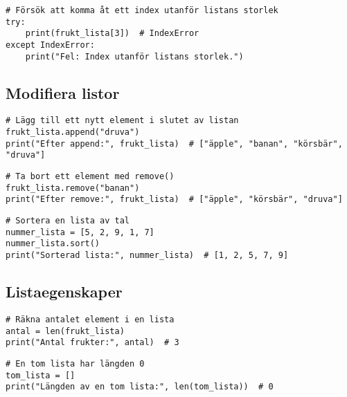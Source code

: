 \begin{lstlisting}[title=Exempel 7: Indexeringsfel (out-of-bounds)]
# Försök att komma åt ett index utanför listans storlek
try:
    print(frukt_lista[3])  # IndexError
except IndexError:
    print("Fel: Index utanför listans storlek.")
\end{lstlisting}

\subsection*{Modifiera listor}

\begin{lstlisting}[title=Exempel 8: Lägg till ett element med append()]
# Lägg till ett nytt element i slutet av listan
frukt_lista.append("druva")
print("Efter append:", frukt_lista)  # ["äpple", "banan", "körsbär", "druva"]
\end{lstlisting}

\begin{lstlisting}[title=Exempel 9: Ta bort ett element med remove()]
# Ta bort ett element med remove()
frukt_lista.remove("banan")
print("Efter remove:", frukt_lista)  # ["äpple", "körsbär", "druva"]
\end{lstlisting}

\begin{lstlisting}[title=Exempel 10: Sortera en lista med sort()]
# Sortera en lista av tal
nummer_lista = [5, 2, 9, 1, 7]
nummer_lista.sort()
print("Sorterad lista:", nummer_lista)  # [1, 2, 5, 7, 9]
\end{lstlisting}

\subsection*{Listaegenskaper}

\begin{lstlisting}[title=Exempel 11: Antal element med len()]
# Räkna antalet element i en lista
antal = len(frukt_lista)
print("Antal frukter:", antal)  # 3
\end{lstlisting}

\begin{lstlisting}[title=Exempel 12: Tom lista med len()]
# En tom lista har längden 0
tom_lista = []
print("Längden av en tom lista:", len(tom_lista))  # 0
\end{lstlisting}
